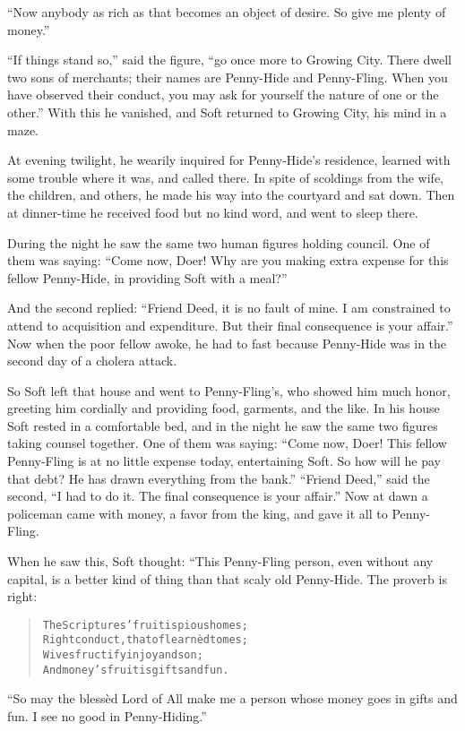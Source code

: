 \documentclass[article, twoside, 14pt]{memoir}
\renewenvironment{verbatim}{%
\begin{quote}%
\vskip -10pt%
\begin{alltt}\normalfont\large}{\end{alltt}%
\end{quote}%
\vskip -10pt
} %
\begin{document}
``Now anybody as rich as that becomes an object of desire. So give me plenty of money.''

``If things stand so,'' said the figure,
``go once more to Growing City. There dwell two sons of merchants; their names are Penny-Hide and Penny-Fling. When you have observed their conduct, you may ask for yourself the nature of one or the other.''
With this he vanished, and Soft returned to Growing City, his mind
in a maze.

At evening twilight, he wearily inquired for Penny-Hide's
residence, learned with some trouble where it was, and called
there. In spite of scoldings from the wife, the children, and
others, he made his way into the courtyard and sat down. Then at
dinner-time he received food but no kind word, and went to sleep
there.

During the night he saw the same two human figures holding council.
One of them was saying:
``Come now, Doer! Why are you making extra expense for this fellow Penny-Hide, in providing Soft with a meal?''

And the second replied:
``Friend Deed, it is no fault of mine. I am constrained to attend to acquisition and expenditure. But their final consequence is your affair.''
Now when the poor fellow awoke, he had to fast because Penny-Hide
was in the second day of a cholera attack.

So Soft left that house and went to Penny-Fling's, who showed him
much honor, greeting him cordially and providing food, garments,
and the like. In his house Soft rested in a comfortable bed, and in
the night he saw the same two figures taking counsel together. One
of them was saying:
``Come now, Doer! This fellow Penny-Fling is at no little expense today, entertaining Soft. So how will he pay that debt? He has drawn everything from the bank.''
``Friend Deed,'' said the second,
``I had to do it. The final consequence is your affair.'' Now at
dawn a policeman came with money, a favor from the king, and gave
it all to Penny-Fling.

When he saw this, Soft thought: “This Penny-Fling person, even
without any capital, is a better kind of thing than that scaly old
Penny-Hide. The proverb is right:

\begin{verbatim}
The Scriptures' fruit is pious homes;
Right conduct, that of learnèd tomes;
Wives fructify in joy and son;
And money's fruit is gifts and fun.
\end{verbatim}
``So may the blessèd Lord of All make me a person whose money goes in gifts and fun. I see no good in Penny-Hiding.''
\end{document}
